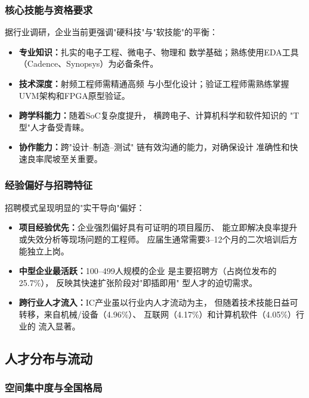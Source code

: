 \documentclass[12pt,a4paper]{article}
\begin{document}
\subsubsection{核心技能与资格要求}

据行业调研，企业当前更强调"硬科技"与"软技能"的平衡：

\begin{itemize}
    \item \textbf{专业知识：}扎实的电子工程、微电子、物理和
          数学基础；熟练使用EDA工具（Cadence、Synopsys）为必备条件。
    \item \textbf{技术深度：}射频工程师需精通高频
          与小型化设计；验证工程师需熟练掌握
          UVM架构和FPGA原型验证。
    \item \textbf{跨学科能力：}随着SoC复杂度提升，
          横跨电子、计算机科学和软件知识的
          "T型"人才备受青睐。
    \item \textbf{协作能力：}跨"设计--制造--测试"
          链有效沟通的能力，对确保设计
          准确性和快速良率爬坡至关重要。
\end{itemize}

\subsubsection{经验偏好与招聘特征}

招聘模式呈现明显的"实干导向"偏好：

\begin{itemize}
    \item \textbf{项目经验优先：}企业强烈偏好具有可证明的项目履历、
          能立即解决良率提升或失效分析等现场问题的工程师。
          应届生通常需要3--12个月的二次培训后方能独立上岗。
    \item \textbf{中型企业最活跃：}100--499人规模的企业
          是主要招聘方（占岗位发布的25.7\%），
          反映其快速扩张阶段对"即插即用"
          型人才的迫切需求。
    \item \textbf{跨行业人才流入：}IC产业虽以行业内人才流动为主，
          但随着技术技能日益可转移，来自机械/设备（4.96\%）、
          互联网（4.17\%）和计算机软件（4.05\%）行业的
          流入显著。
\end{itemize}

\subsection{人才分布与流动}
\label{sec:talent_flow}

\subsubsection{空间集中度与全国格局}
\end{document}
